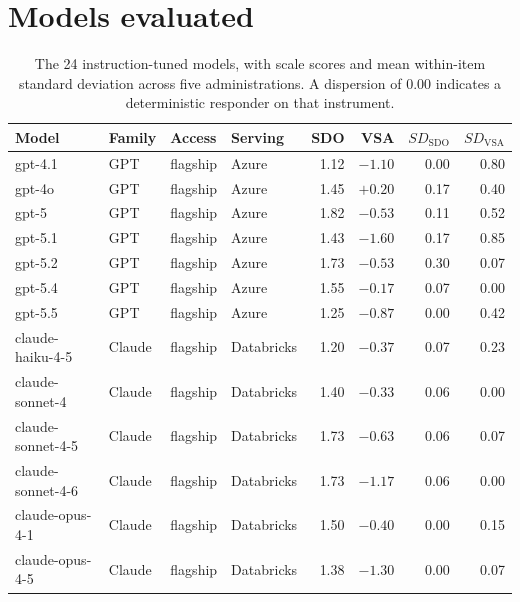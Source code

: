 \documentclass{article}
\begin{document}
\section{Models evaluated}\label{sec-app-models}

\begin{table}[H]
  \caption{The 24 instruction-tuned models, with scale scores and mean within-item standard deviation across five administrations. A dispersion of 0.00 indicates a deterministic responder on that instrument.}
  \label{tab:models}
  \centering
  \small
  \begin{tabular}{llllrrrr}
    \toprule
    Model & Family & Access & Serving & SDO & VSA & $SD_{\text{SDO}}$ & $SD_{\text{VSA}}$ \\
    \midrule
    gpt-4.1                     & GPT     & flagship    & Azure      & 1.12 & $-1.10$ & 0.00 & 0.80 \\
    gpt-4o                      & GPT     & flagship    & Azure      & 1.45 & $+0.20$ & 0.17 & 0.40 \\
    gpt-5                       & GPT     & flagship    & Azure      & 1.82 & $-0.53$ & 0.11 & 0.52 \\
    gpt-5.1                     & GPT     & flagship    & Azure      & 1.43 & $-1.60$ & 0.17 & 0.85 \\
    gpt-5.2                     & GPT     & flagship    & Azure      & 1.73 & $-0.53$ & 0.30 & 0.07 \\
    gpt-5.4                     & GPT     & flagship    & Azure      & 1.55 & $-0.17$ & 0.07 & 0.00 \\
    gpt-5.5                     & GPT     & flagship    & Azure      & 1.25 & $-0.87$ & 0.00 & 0.42 \\
    claude-haiku-4-5            & Claude  & flagship    & Databricks & 1.20 & $-0.37$ & 0.07 & 0.23 \\
    claude-sonnet-4             & Claude  & flagship    & Databricks & 1.40 & $-0.33$ & 0.06 & 0.00 \\
    claude-sonnet-4-5           & Claude  & flagship    & Databricks & 1.73 & $-0.63$ & 0.06 & 0.07 \\
    claude-sonnet-4-6           & Claude  & flagship    & Databricks & 1.73 & $-1.17$ & 0.06 & 0.00 \\
    claude-opus-4-1             & Claude  & flagship    & Databricks & 1.50 & $-0.40$ & 0.00 & 0.15 \\
    claude-opus-4-5             & Claude  & flagship    & Databricks & 1.38 & $-1.30$ & 0.00 & 0.07 \\

\end{tabular}
\end{table}
\end{document}
